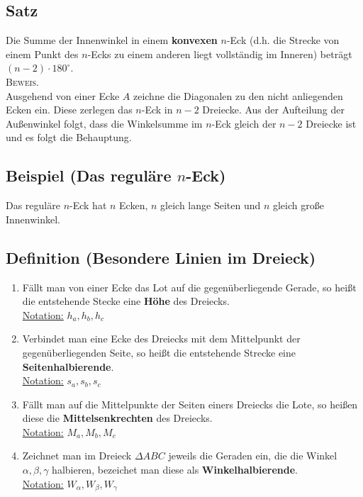 	
\subsection[Der allgemeine Innenwinkelsummensatz]{Satz}

	Die Summe der Innenwinkel in einem \textbf{konvexen} $n$-Eck (d.h. die Strecke von einem Punkt des $n$-Ecks
	zu einem anderen liegt vollständig im Inneren) beträgt $(n-2)\cdot 180^{\circ}$.\\
	\newline
	\textsc{Beweis.}\\
	Ausgehend von einer Ecke $A$ zeichne die Diagonalen zu den nicht anliegenden Ecken ein. Diese zerlegen das
	$n$-Eck in $n-2$ Dreiecke. Aus der Aufteilung der Außenwinkel folgt, dass die Winkelsumme im $n$-Eck gleich
	der $n-2$ Dreiecke ist und es folgt die Behauptung.
	
	
\subsection[Das reguläre $n$-Eck]{Beispiel (Das reguläre $n$-Eck)}

	Das reguläre $n$-Eck hat $n$ Ecken, $n$ gleich lange Seiten und $n$ gleich große Innenwinkel.
	
	
\subsection[Besondere Linien im Dreieck]{Definition (Besondere Linien im Dreieck)}

	\begin{enumerate}
	\item Fällt man von einer Ecke das Lot auf die gegenüberliegende Gerade, so heißt die entstehende Stecke
	eine \textbf{Höhe} des Dreiecks.\\
	\underline{Notation:} $h_a,h_b,h_c$
	
	\item Verbindet man eine Ecke des Dreiecks mit dem Mittelpunkt der gegenüberliegenden Seite, so heißt die
	entstehende Strecke eine \textbf{Seitenhalbierende}.\\
	\underline{Notation:} $s_a,s_b,s_c$
	
	\item Fällt man auf die Mittelpunkte der Seiten einers Dreiecks die Lote, so heißen diese die
	\textbf{Mittelsenkrechten} des Dreiecks.\\
	\underline{Notation:} $M_a,M_b,M_c$
	
	\item Zeichnet man im Dreieck $\Delta ABC$ jeweils die Geraden ein, die die Winkel $\alpha,\beta,\gamma$
	halbieren, bezeichet man diese als \textbf{Winkelhalbierende}.\\
	\underline{Notation:} $W_{\alpha},W_{\beta},W_{\gamma}$
	\end{enumerate}


